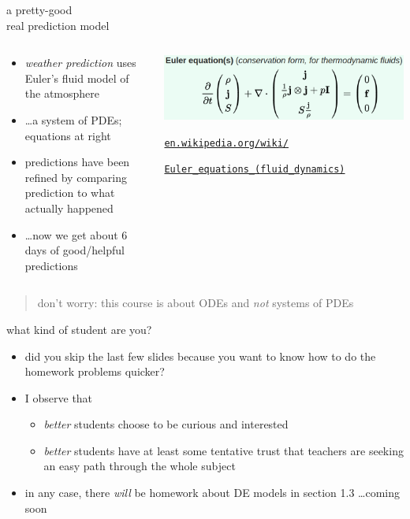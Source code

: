 \documentclass{beamer}
\begin{document}
\begin{frame}{a pretty-good \\ real prediction model}

\begin{columns}
\begin{column}{0.5\textwidth}
\begin{itemize}
\item \emph{weather prediction} uses Euler's fluid model of the atmosphere
\item \dots a system of PDEs; equations at right
\item predictions have been refined by comparing prediction to what actually happened
\item \dots now we get about 6 days of good/helpful predictions
\end{itemize}
\end{column}
\begin{column}{0.5\textwidth}
\includegraphics[width=\textwidth]{figs/euler-equations}

\medskip

\quad \tiny \href{https://en.wikipedia.org/wiki/Euler_equations_(fluid_dynamics)}{\texttt{en.wikipedia.org/wiki/}}

\qquad \href{https://en.wikipedia.org/wiki/Euler_equations_(fluid_dynamics)}{\texttt{Euler\_equations\_(fluid\_dynamics)}}
\end{column}
\end{columns}

\bigskip
\begin{quote}
\alert{don't worry}: this course is about ODEs and \emph{not} systems of PDEs
\end{quote}
\end{frame}


\begin{frame}{what kind of student are you?}

\begin{itemize}
\item did you skip the last few slides because you want to know how to do the homework problems quicker?
\item I observe that
    \begin{itemize}
    \item \emph{better} students choose to be curious and interested
    \item \emph{better} students have at least some tentative trust that teachers are seeking an easy path through the whole subject
    \end{itemize}

\bigskip
\item in any case, there \emph{will} be homework about DE models in section 1.3 \dots coming soon
\end{itemize}
\end{frame}
\end{document}
